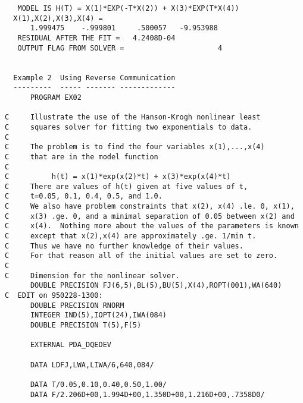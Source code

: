 \begin{verbatim}
   MODEL IS H(T) = X(1)*EXP(-T*X(2)) + X(3)*EXP(T*X(4))
  X(1),X(2),X(3),X(4) =
      1.999475    -.999801     .500057   -9.953988
   RESIDUAL AFTER THE FIT =   4.2408D-04
   OUTPUT FLAG FROM SOLVER =                      4


  Example 2  Using Reverse Communication
  ---------  ----- ------- -------------
      PROGRAM EX02

C     Illustrate the use of the Hanson-Krogh nonlinear least
C     squares solver for fitting two exponentials to data.
C
C     The problem is to find the four variables x(1),...,x(4)
C     that are in the model function
C
C          h(t) = x(1)*exp(x(2)*t) + x(3)*exp(x(4)*t)
C     There are values of h(t) given at five values of t,
C     t=0.05, 0.1, 0.4, 0.5, and 1.0.
C     We also have problem constraints that x(2), x(4) .le. 0, x(1),
C     x(3) .ge. 0, and a minimal separation of 0.05 between x(2) and
C     x(4).  Nothing more about the values of the parameters is known
C     except that x(2),x(4) are approximately .ge. 1/min t.
C     Thus we have no further knowledge of their values.
C     For that reason all of the initial values are set to zero.
C
C     Dimension for the nonlinear solver.
      DOUBLE PRECISION FJ(6,5),BL(5),BU(5),X(4),ROPT(001),WA(640)
C  EDIT on 950228-1300:
      DOUBLE PRECISION RNORM
      INTEGER IND(5),IOPT(24),IWA(084)
      DOUBLE PRECISION T(5),F(5)

      EXTERNAL PDA_DQEDEV

      DATA LDFJ,LWA,LIWA/6,640,084/

      DATA T/0.05,0.10,0.40,0.50,1.00/
      DATA F/2.206D+00,1.994D+00,1.350D+00,1.216D+00,.7358D0/


\end{verbatim}
